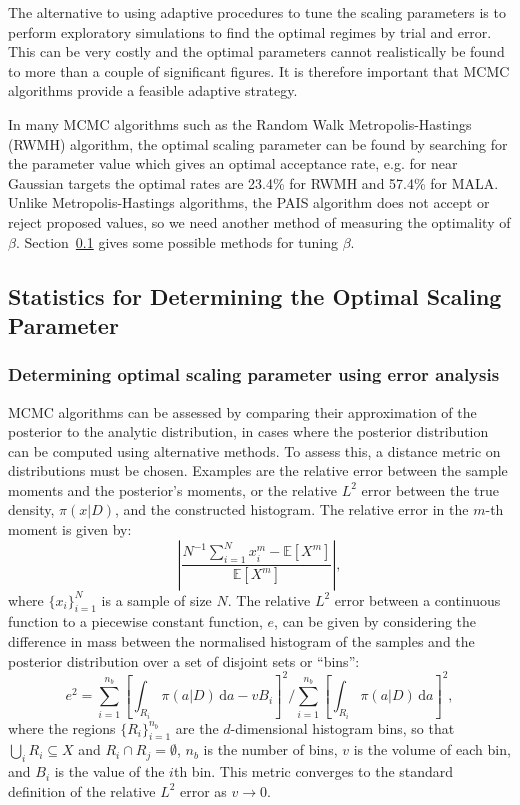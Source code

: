 \documentclass[final]{siamltex}
\begin{document}
The alternative to using adaptive procedures to tune the scaling
parameters is to perform exploratory simulations to find the optimal
regimes by trial and error. This can be very costly and the optimal
parameters cannot realistically be found to more than a couple of
significant figures. It is therefore important that MCMC algorithms
provide a feasible adaptive strategy.

In many MCMC algorithms such as the Random Walk Metropolis-Hastings (RWMH) algorithm, the optimal scaling parameter can be found by searching for the parameter value which gives an optimal acceptance rate, e.g. for near Gaussian targets the optimal rates are 23.4\% for RWMH and 57.4\% for MALA\cite{roberts2001optimal}. Unlike Metropolis-Hastings algorithms, the PAIS algorithm does not accept or reject proposed values, so we need another method of measuring the optimality of $\beta$. Section~\ref{sec:statistics} gives some possible methods for tuning $\beta$.

\subsection{Statistics for Determining the Optimal Scaling Parameter}\label{sec:statistics}

\subsubsection{Determining optimal scaling parameter using error analysis}

MCMC algorithms can be assessed by comparing their approximation of
the posterior to the analytic distribution, in cases where the
posterior distribution can be computed using alternative methods. To
assess this, a distance metric on distributions must be chosen. Examples are the
relative error between the sample moments and the posterior's moments, or the
relative $L^2$ error between the true density, $\pi(x|D)$, and the
constructed histogram. The relative error in the $m$-th moment is
given by:
\begin{equation}\label{eq:34567}
	\left|\frac{N^{-1}\sum_{i=1}^N \! x_i^m - \mathbb{E}[X^m]}{\mathbb{E}[X^m]}\right|,
\end{equation}
where $\{x_i\}_{i=1}^N$ is a sample of size $N$. The relative $L^2$
error between a continuous function to a piecewise constant function,
$e$, can be given by considering the difference in mass between the
normalised histogram of the samples and the posterior distribution
over a set of disjoint sets or ``bins'':
\begin{equation}\label{eqn:L2_error}
	e^2 = \sum\limits_{i=1}^{n_b}\left[\displaystyle\int_{R_i} \! \pi(a|D) \, \mbox{d}a - vB_i\right]^2 \Big/ \sum\limits_{i=1}^{n_b}\left[\displaystyle\int_{R_i} \! \pi(a|D) \, \mbox{d}a\right]^2,
\end{equation}
where the regions $\{R_i\}_{i=1}^{n_b}$ are the $d$-dimensional
histogram bins, so that $\bigcup_i R_i \subseteq X$ and
$R_i\cap R_j=\emptyset$, $n_b$ is the number of bins, $v$ is the
volume of each bin, and $B_i$ is the value of the $i$th bin. This
metric converges to the standard definition of the relative $L^2$
error as $v\rightarrow 0$.
\end{document}
